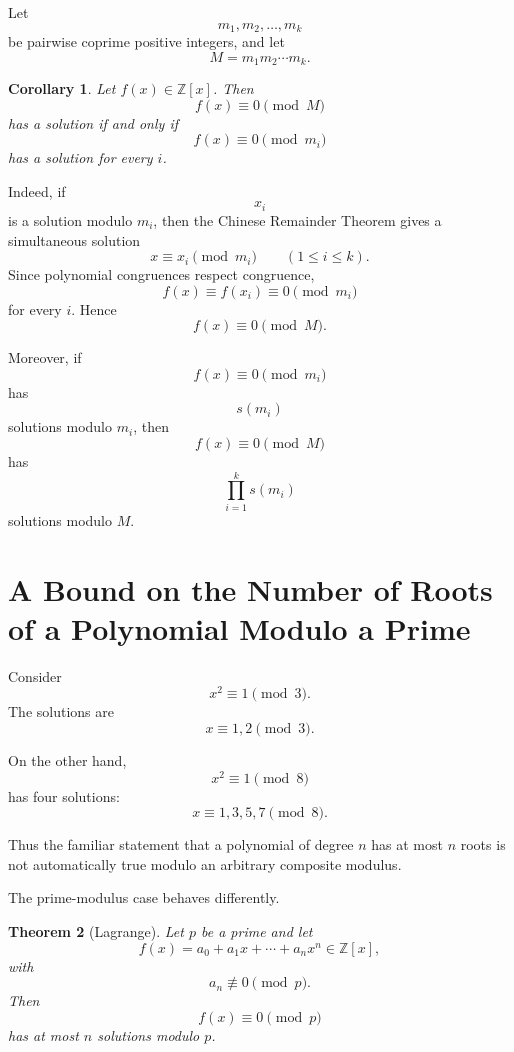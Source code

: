 \documentclass[11pt]{article}
\newtheorem{theorem}{Theorem}[section]
\newtheorem{corollary}[theorem]{Corollary}
\theoremstyle{remark}
\newcommand{\Z}{\mathbb Z}
\begin{document}
Let
\[
    m_1,m_2,\ldots,m_k
\]
be pairwise coprime positive integers, and let
\[
    M=m_1m_2\cdots m_k.
\]

\begin{corollary}
Let $f(x)\in\Z[x]$. Then
\[
    f(x)\equiv0\pmod M
\]
has a solution if and only if
\[
    f(x)\equiv0\pmod{m_i}
\]
has a solution for every $i$.
\end{corollary}

Indeed, if
\[
    x_i
\]
is a solution modulo $m_i$, then the Chinese Remainder Theorem gives a
simultaneous solution
\[
    x\equiv x_i\pmod{m_i}
    \qquad(1\le i\le k).
\]
Since polynomial congruences respect congruence,
\[
    f(x)\equiv f(x_i)\equiv0\pmod{m_i}
\]
for every $i$. Hence
\[
    f(x)\equiv0\pmod M.
\]

Moreover, if
\[
    f(x)\equiv0\pmod{m_i}
\]
has
\[
    s(m_i)
\]
solutions modulo $m_i$, then
\[
    \boxed{
    f(x)\equiv0\pmod M
    }
\]
has
\[
    \boxed{
    \prod_{i=1}^k s(m_i)
    }
\]
solutions modulo $M$.

\section{A Bound on the Number of Roots of a Polynomial Modulo a Prime}

Consider
\[
    x^2\equiv1\pmod3.
\]
The solutions are
\[
    x\equiv1,2\pmod3.
\]

On the other hand,
\[
    x^2\equiv1\pmod8
\]
has four solutions:
\[
    \boxed{x\equiv1,3,5,7\pmod8.}
\]

Thus the familiar statement that a polynomial of degree $n$ has at most
$n$ roots is not automatically true modulo an arbitrary composite
modulus.

The prime-modulus case behaves differently.

\begin{theorem}[Lagrange]
Let $p$ be a prime and let
\[
    f(x)
    =
    a_0+a_1x+\cdots+a_nx^n
    \in\Z[x],
\]
with
\[
    a_n\not\equiv0\pmod p.
\]
Then
\[
    f(x)\equiv0\pmod p
\]
has at most $n$ solutions modulo $p$.
\end{theorem}
\end{document}
